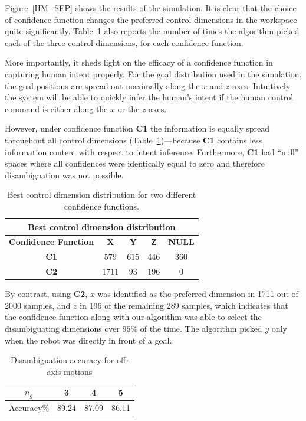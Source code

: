 \documentclass[conference]{IEEEtran}
\begin{document}
Figure~\ref{HM_SEP} shows the results of the simulation. It is clear that the choice of confidence function changes the preferred control dimensions in the workspace quite significantly. Table~\ref{HMD} also reports the number of times the algorithm picked each of the three control dimensions, for each confidence function.

More importantly, it sheds light on the efficacy of a confidence function in capturing human intent properly. For the goal distribution used in the simulation, the goal positions are spread out maximally along the $x$ and $z$ axes. Intuitively the system will be able to quickly infer the human's intent if the human control command is either along the $x$ or the $z$ axes. 

However, under confidence function \textbf{C1} the information is equally spread throughout all control dimensions (Table~\ref{HMD})---because \textbf{C1} contains less information content with respect to intent inference. Furthermore, \textbf{C1} had ``null'' spaces where all confidences were identically equal to zero and therefore disambiguation was not possible.
\begin{table}[t]
	\centering
	\begin{tabular}{|c|c|c|c|c|}
		\hline
		\multicolumn{5}{|c|}{Best control dimension distribution} \\
		\hline
		\textbf{Confidence Function} & \textbf{X} & \textbf{Y} & \textbf{Z} & \textbf{NULL} \\ \hline
		
		\textbf{C1} & $579$ & $615$ & $446$ & $360$ \\ \hline
		\textbf{C2} & $1711$ & $93$ & $196$ & $0$\\ \hline
		
	\end{tabular}
	\vspace{.2cm}
	\caption{Best control dimension distribution for two different confidence functions.} 
	\label{HMD}
	\vspace{-.5cm}
\end{table}

By contrast, using \textbf{C2},  $x$ was identified as the preferred dimension in 1711 out of 2000 samples, and $z$ in 196 of the remaining 289 samples, which indicates that the confidence function along with our algorithm was able to select the disambiguating dimensions over $95\%$ of the time. The algorithm picked $y$ only when the robot was directly in front of a goal. 
\begin{table}[t]
	\centering
	\begin{tabular}{|c|c|c|c|}
		\hline
		$n_g$ & 3 & 4 & 5 \\
		\hline
		Accuracy\% & 89.24 & 87.09 & 86.11 \\
		\hline
	\end{tabular}
	\vspace{.2cm}
	\caption{Disambiguation accuracy for off-axis motions} 
	\label{SIM}
	\vspace{-.5cm}
\end{table}
\end{document}
